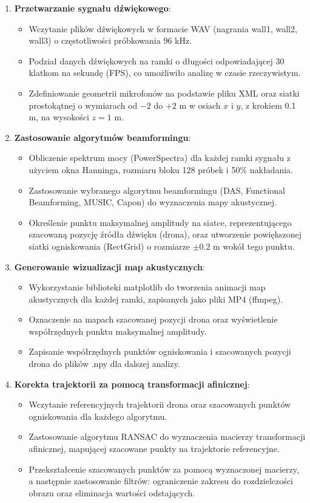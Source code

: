 \documentclass[12pt]{article}
\begin{document}
\begin{enumerate}
\item \textbf{Przetwarzanie sygnału dźwiękowego}:
\begin{itemize}
\item Wczytanie plików dźwiękowych w formacie WAV (nagrania wall1, wall2, wall3) o częstotliwości próbkowania 96 kHz.
\item Podział danych dźwiękowych na ramki o długości odpowiadającej 30 klatkom na sekundę (FPS), co umożliwiło analizę w czasie rzeczywistym.
\item Zdefiniowanie geometrii mikrofonów na podstawie pliku XML oraz siatki prostokątnej o wymiarach od $-2$ do $+2$ m w osiach $x$ i $y$, z krokiem 0.1 m, na wysokości $z=1$ m.
\end{itemize}

\item \textbf{Zastosowanie algorytmów beamformingu}:
\begin{itemize}
    \item Obliczenie spektrum mocy (PowerSpectra) dla każdej ramki sygnału z użyciem okna Hanninga, rozmiaru bloku 128 próbek i 50\% nakładania.
    \item Zastosowanie wybranego algorytmu beamformingu (DAS, Functional Beamforming, MUSIC, Capon) do wyznaczenia mapy akustycznej.
    \item Określenie punktu maksymalnej amplitudy na siatce, reprezentującego szacowaną pozycję źródła dźwięku (drona), oraz utworzenie powiększonej siatki ogniskowania (RectGrid) o rozmiarze $\pm 0.2$ m wokół tego punktu.
\end{itemize}

\item \textbf{Generowanie wizualizacji map akustycznych}:
\begin{itemize}
    \item Wykorzystanie biblioteki matplotlib do tworzenia animacji map akustycznych dla każdej ramki, zapisanych jako pliki MP4 (ffmpeg).
    \item Oznaczenie na mapach szacowanej pozycji drona oraz wyświetlenie współrzędnych punktu maksymalnej amplitudy.
    \item Zapisanie współrzędnych punktów ogniskowania i szacowanych pozycji drona do plików .npy dla dalszej analizy.
\end{itemize}

\item \textbf{Korekta trajektorii za pomocą transformacji afinicznej}:
\begin{itemize}
    \item Wczytanie referencyjnych trajektorii drona  oraz szacowanych punktów ogniskowania dla każdego algorytmu.
    \item Zastosowanie algorytmu RANSAC do wyznaczenia macierzy transformacji afinicznej, mapującej szacowane punkty na trajektorie referencyjne.
    \item Przekształcenie szacowanych punktów za pomocą wyznaczonej macierzy, a następnie zastosowanie filtrów: ograniczenie zakresu do rozdzielczości obrazu oraz eliminacja wartości odstających.
\end{itemize}


\end{enumerate}
\end{document}
